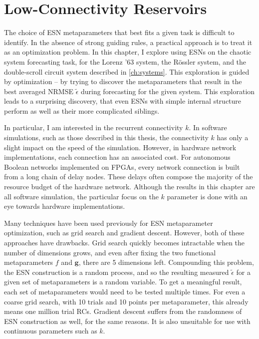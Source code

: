 \chapter{Low-Connectivity Reservoirs}\label{ch:low-connectivity}

The choice of ESN metaparameters that best fits a given task is
difficult to identify. In the absence of strong guiding rules, a
practical approach is to treat it as an optimization problem. In this
chapter, I explore using ESNs on the chaotic system forecasting task,
for the Lorenz '63 system, the R{\"{o}}ssler system, and the
double-scroll circuit system described in \cref{ch:systems}. This
exploration is guided by optimization -- by trying to discover the
metaparameters that result in the best averaged NRMSE
$\tilde{\epsilon}$ during forecasting for the given system. This
exploration leads to a surprising discovery, that even ESNs with
simple internal structure perform as well as their more complicated
siblings.

In particular, I am interested in the recurrent connectivity $k$. In
software simulations, such as those described in this thesis, the
connectivity $k$ has only a slight impact on the speed of the
simulation. However, in hardware network implementations, each
connection has an associated cost. For autonomous Boolean networks
implemented on FPGAs, every network connection is built from a long
chain of delay nodes.\cite{canaday2018} These delays often compose the
majority of the resource budget of the hardware network. Although the
results in this chapter are all software simulation, the particular
focus on the $k$ parameter is done with an eye towards hardware
implementations.

Many techniques have been used previously for ESN metaparameter
optimization, such as grid search\cite{rodan2011} and gradient
descent\cite{jaeger2007}. However, both of these approaches have
drawbacks. Grid search quickly becomes intractable when the number of
dimensions grows, and even after fixing the two functional
metaparameters $f$ and $\bm{g}$, there are 5 dimensions
left. Compounding this problem, the ESN construction is a random
process, and so the resulting measured $\tilde{\epsilon}$ for a given
set of metaparameters is a random variable. To get a meaningful
result, each set of metaparameters would need to be tested multiple
times. For even a coarse grid search, with 10 trials and 10 points per
metaparameter, this already means one million trial RCs. Gradient
descent suffers from the randomness of ESN construction as well, for
the same reasons. It is also unsuitable for use with continuous
parameters such as $k$.


